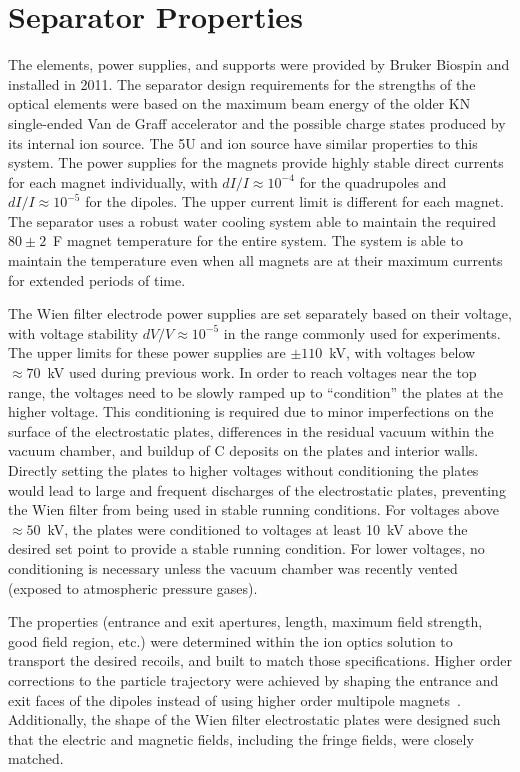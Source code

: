 \section{Separator Properties}

The elements, power supplies, and supports were provided by Bruker
Biospin and installed in 2011. The separator design requirements for the
strengths of the optical elements were based on the maximum beam energy
of the older KN single-ended Van de Graff accelerator and the possible
charge states produced by its internal ion source. The 5U and ion source
have similar properties to this system. The power supplies for the
magnets provide highly stable direct currents for each magnet
individually, with $dI/I \approx 10^{-4}$ for the quadrupoles and $dI/I
\approx 10^{-5}$ for the dipoles. The upper current limit is different
for each magnet. The separator uses a robust water cooling system able
to maintain the required $80\pm2$~\degree{}F magnet temperature for the
entire system. The system is able to maintain the temperature even when
all magnets are at their maximum currents for extended periods of time.

The Wien filter electrode power supplies are set separately based on
their voltage, with voltage stability $dV/V \approx 10^{-5}$ in the
range commonly used for experiments. The upper limits for these power
supplies are $\pm110$~kV, with voltages below $\approx 70$~kV used
during previous work. In order to reach voltages near the top range, the
voltages need to be slowly ramped up to ``condition'' the plates at the
higher voltage. This conditioning is required due to minor imperfections
on the surface of the electrostatic plates, differences in the residual
vacuum within the vacuum chamber, and buildup of C deposits on the
plates and interior walls. Directly setting the plates to higher
voltages without conditioning the plates would lead to large and
frequent discharges of the electrostatic plates, preventing the Wien
filter from being used in stable running conditions. For voltages above
$\approx 50$~kV, the plates were conditioned to voltages at least 10~kV
above the desired set point to provide a stable running condition. For
lower voltages, no conditioning is necessary unless the vacuum chamber
was recently vented (exposed to atmospheric pressure gases).

The properties (entrance and exit apertures, length, maximum field
strength, good field region, etc.) were determined within the ion optics
solution to transport the desired recoils, and built to match those
specifications. Higher order corrections to the particle trajectory were
achieved by shaping the entrance and exit faces of the dipoles instead
of using higher order multipole magnets~\cite{Couder2008}. Additionally,
the shape of the Wien filter electrostatic plates were designed such
that the electric and magnetic fields, including the fringe fields, were
closely matched.


